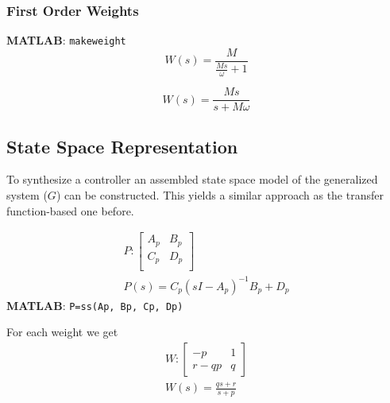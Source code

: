 \subsubsection{First Order Weights}
\textbf{MATLAB}: \texttt{makeweight}
\newpar{}
\begin{equation*}
    W(s) = \frac{M}{\frac{Ms}{\omega}+1}
\end{equation*}

\begin{equation*}
    W(s) = \frac{Ms}{s+M\omega}
\end{equation*}

\subsection{State Space Representation}
To synthesize a controller an assembled state space model of the generalized system ($G$) can be constructed. This yields a similar approach as the transfer function-based one before.

\begin{gather*}
    P : \left[
        \begin{array}{c|c} %
            A_p & B_p \\
            \hline %
            C_p & D_p \\
        \end{array}
        \right]                            \\
    P(s) = {C_p(sI-A_p)}^{-1}B_p+D_p
\end{gather*}
\textbf{MATLAB}: \texttt{P=ss(Ap, Bp, Cp, Dp)}


For each weight we get
\begin{gather*}
    W : \left[
        \begin{array}{c|c} %
            -p   & 1 \\
            \hline %
            r-qp & q
        \end{array}
        \right]                   \\
    W(s) = \frac{qs+r}{s+p}
\end{gather*}


